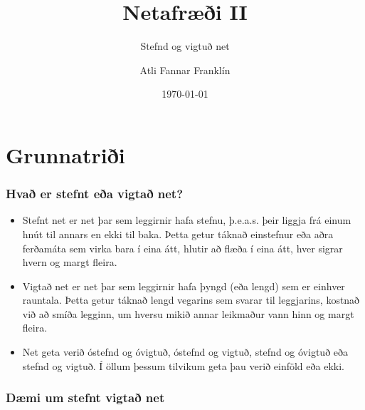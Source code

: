 \documentclass{beamer}
\title{Netafræði II}
\subtitle{Stefnd og vigtuð net}
\author{Atli Fannar Franklín}
\date{\today}
\begin{document}
\frame{\titlepage}

\section[Grunnatriði]{Grunnatriði}

\begin{frame}
\frametitle{Hvað er stefnt eða vigtað net?}

\begin{itemize}

\item<1-> Stefnt net er net þar sem leggirnir hafa stefnu, þ.e.a.s. þeir liggja frá einum hnút til annars en ekki til baka. Þetta getur táknað einstefnur eða aðra ferðamáta sem virka bara í eina átt, hlutir að flæða í eina átt, hver sigrar hvern og margt fleira.

\item<2-> Vigtað net er net þar sem leggirnir hafa þyngd (eða lengd) sem er einhver rauntala. Þetta getur táknað lengd vegarins sem svarar til leggjarins, kostnað við að smíða legginn, um hversu mikið annar leikmaður vann hinn og margt fleira.

\item<3-> Net geta verið óstefnd og óvigtuð, óstefnd og vigtuð, stefnd og óvigtuð eða stefnd og vigtuð. Í öllum þessum tilvikum geta þau verið einföld eða ekki.

\end{itemize}

\end{frame}

\begin{frame}
\frametitle{Dæmi um stefnt vigtað net}

\begin{center}
\hspace*{-1.5cm}
\end{center}

\end{frame}
\end{document}
